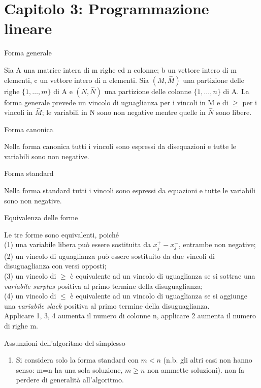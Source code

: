 \documentclass[answers, a4paper, 11pt]{exam}
\begin{document}
\section{Capitolo 3: Programmazione lineare}
\begin{questions}
\question Forma generale
\begin{solution}
Sia A una matrice intera di m righe ed n colonne; b un vettore intero di m elementi, c un vettore intero di n elementi. Sia $(M, \stackrel{-}{M})$ una partizione delle righe $\{1,\ldots, m\}$ di A e $(N, \stackrel{-}{N})$ una partizione delle colonne $\{1,\ldots, n\}$ di A. La forma generale prevede un vincolo di uguaglianza per i vincoli in M e di $\ge$ per i vincoli in $\stackrel{-}{M}$; le variabili in N sono non negative mentre quelle in $\stackrel{-}{N}$ sono libere.
\end{solution}
\question Forma canonica
\begin{solution}
Nella forma canonica tutti i vincoli sono espressi da disequazioni e tutte le variabili sono non negative.
\end{solution}
\question Forma standard
\begin{solution}
Nella forma standard tutti i vincoli sono espressi da equazioni e tutte le variabili sono non negative.
\end{solution}
\question Equivalenza delle forme
\begin{solution}
Le tre forme sono equivalenti, poiché\\ (1) una variabile libera può essere sostituita da $x_{j}^{+} - x_{j}^{-}$, entrambe non negative;\\ (2) un vincolo di uguaglianza può essere sostituito da due vincoli di disuguaglianza con versi opposti;\\(3) un vincolo di $\ge$ è equivalente ad un vincolo di uguaglianza se si sottrae una \emph{variabile surplus} positiva al primo termine della disuguaglianza;\\(4) un vincolo di $\le$ è equivalente ad un vincolo di uguaglianza se si aggiunge una \emph{variabile slack} positiva al primo termine della disuguaglianza.\\Applicare 1, 3, 4 aumenta il numero di colonne n, applicare 2 aumenta il numero di righe m.
\end{solution}
\question Assunzioni dell'algoritmo del simplesso
\begin{solution}
\begin{enumerate}
 \item Si considera solo la forma standard con $m < n$ (n.b. gli altri casi non hanno senso: m=n ha una sola soluzione, $m\ge n$ non ammette soluzioni). non fa perdere di generalità all'algoritmo.

\end{enumerate}
\end{solution}
\end{questions}
\end{document}
